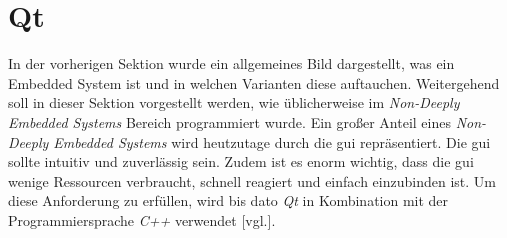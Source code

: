 \section{Qt}
\label{sec:qt}
In der vorherigen Sektion wurde ein allgemeines Bild dargestellt, was ein Embedded System
ist und in welchen Varianten diese auftauchen. Weitergehend soll in dieser Sektion
vorgestellt werden, wie üblicherweise im \emph{Non-Deeply Embedded Systems} Bereich programmiert
wurde.
\newline
\newline
Ein großer Anteil eines \emph{Non-Deeply Embedded Systems} wird heutzutage durch die \ac{gui}
repräsentiert. Die \ac{gui} sollte intuitiv und zuverlässig sein.
Zudem ist es enorm wichtig, dass die \ac{gui} wenige Ressourcen verbraucht, schnell
reagiert und einfach einzubinden ist. Um diese Anforderung zu erfüllen, wird bis dato \emph{Qt} in
Kombination mit der Programmiersprache \emph{C++} verwendet \cite{QtOnEmbeddedLinux}[vgl.].





